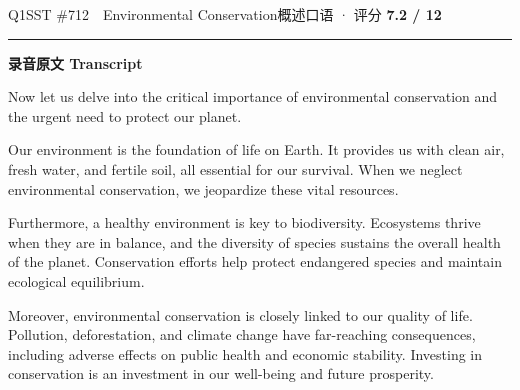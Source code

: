 \documentclass[11pt]{article}
\newcommand{\ptesub}[1]{%
  \par\needspace{2\baselineskip}\smallskip
  {\color{cAccent}\rule[-0.2ex]{3pt}{1.05em}}\hspace{6pt}%
  {\bfseries\color{cHead}#1}\par\nopagebreak\smallskip}
\begin{document}
\begin{qblock}{Q1\quad SST \#712\ \ Environmental Conservation}{概述口语 · 评分 \textcolor{cAccent}{\bfseries 7.2 / 12}}
\ptesub{录音原文 Transcript}
\begin{promptbox}
Now let us delve into the critical importance of environmental conservation and the urgent need to protect our planet.

Our environment is the foundation of life on Earth. It provides us with clean air, fresh water, and fertile soil, all essential for our survival. When we neglect environmental conservation, we jeopardize these vital resources.

Furthermore, a healthy environment is key to biodiversity. Ecosystems thrive when they are in balance, and the diversity of species sustains the overall health of the planet. Conservation efforts help protect endangered species and maintain ecological equilibrium.

Moreover, environmental conservation is closely linked to our quality of life. Pollution, deforestation, and climate change have far-reaching consequences, including adverse effects on public health and economic stability. Investing in conservation is an investment in our well-being and future prosperity.


\end{promptbox}
\end{qblock}
\end{document}
